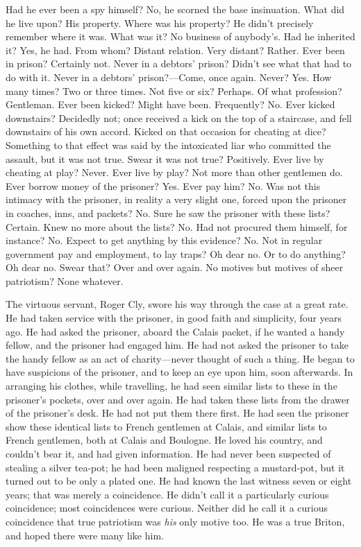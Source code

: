 Had he ever been a spy himself?  No, he scorned the base insinuation.
What did he live upon?  His property.  Where was his property?
He didn't precisely remember where it was.  What was it?  No business
of anybody's.  Had he inherited it?  Yes, he had.  From whom?  Distant
relation.  Very distant?  Rather.  Ever been in prison?  Certainly not.
Never in a debtors' prison?  Didn't see what that had to do with it.
Never in a debtors' prison?---Come, once again.  Never?  Yes.  How many
times?  Two or three times.  Not five or six?  Perhaps.  Of what profession?
Gentleman.  Ever been kicked?  Might have been. Frequently?  No.
Ever kicked downstairs?  Decidedly not; once received a kick on the
top of a staircase, and fell downstairs of his own accord.  Kicked on
that occasion for cheating at dice?  Something to that effect was said
by the intoxicated liar who committed the assault, but it was not
true.  Swear it was not true?  Positively. Ever live by cheating at
play?  Never.  Ever live by play?  Not more than other gentlemen do.
Ever borrow money of the prisoner?  Yes.  Ever pay him?  No. Was not
this intimacy with the prisoner, in reality a very slight one, forced
upon the prisoner in coaches, inns, and packets?  No.  Sure he saw
the prisoner with these lists?  Certain.  Knew no more about the
lists?  No. Had not procured them himself, for instance?  No. Expect
to get anything by this evidence?  No. Not in regular government pay
and employment, to lay traps?  Oh dear no.  Or to do anything?  Oh dear no.
Swear that?  Over and over again.  No motives but motives of sheer patriotism?
None whatever.

The virtuous servant, Roger Cly, swore his way through the case at a
great rate.  He had taken service with the prisoner, in good faith
and simplicity, four years ago.  He had asked the prisoner, aboard
the Calais packet, if he wanted a handy fellow, and the prisoner had
engaged him.  He had not asked the prisoner to take the handy fellow
as an act of charity---never thought of such a thing.  He began to
have suspicions of the prisoner, and to keep an eye upon him, soon
afterwards.  In arranging his clothes, while travelling, he had seen
similar lists to these in the prisoner's pockets, over and over again.
He had taken these lists from the drawer of the prisoner's desk.
He had not put them there first.  He had seen the prisoner show these
identical lists to French gentlemen at Calais, and similar lists to
French gentlemen, both at Calais and Boulogne.  He loved his country,
and couldn't bear it, and had given information.  He had never been
suspected of stealing a silver tea-pot; he had been maligned respecting
a mustard-pot, but it turned out to be only a plated one.  He had
known the last witness seven or eight years; that was merely a
coincidence.  He didn't call it a particularly curious coincidence;
most coincidences were curious.  Neither did he call it a curious
coincidence that true patriotism was \emph{his} only motive too.  He was a
true Briton, and hoped there were many like him.

